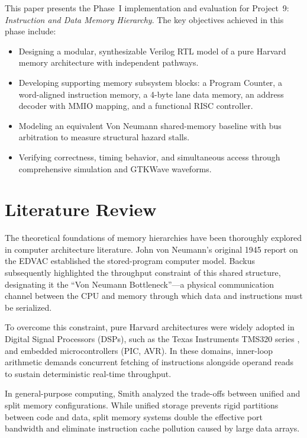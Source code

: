 \documentclass[conference]{IEEEtran}
\begin{document}
This paper presents the Phase~I implementation and evaluation for Project~9: \textit{Instruction and Data Memory Hierarchy}. The key objectives achieved in this phase include:
\begin{itemize}
    \item Designing a modular, synthesizable Verilog RTL model of a pure Harvard memory architecture with independent pathways.
    \item Developing supporting memory subsystem blocks: a Program Counter, a word-aligned instruction memory, a 4-byte lane data memory, an address decoder with MMIO mapping, and a functional RISC controller.
    \item Modeling an equivalent Von Neumann shared-memory baseline with bus arbitration to measure structural hazard stalls.
    \item Verifying correctness, timing behavior, and simultaneous access through comprehensive simulation and GTKWave waveforms.
\end{itemize}

\section{Literature Review}
The theoretical foundations of memory hierarchies have been thoroughly explored in computer architecture literature. John von Neumann's original 1945 report on the EDVAC \cite{vonneumann1945} established the stored-program computer model. Backus \cite{backus1978can} subsequently highlighted the throughput constraint of this shared structure, designating it the ``Von Neumann Bottleneck''---a physical communication channel between the CPU and memory through which data and instructions must be serialized.

To overcome this constraint, pure Harvard architectures were widely adopted in Digital Signal Processors (DSPs), such as the Texas Instruments TMS320 series \cite{smith1997scientist}, and embedded microcontrollers (PIC, AVR). In these domains, inner-loop arithmetic demands concurrent fetching of instructions alongside operand reads to sustain deterministic real-time throughput.

In general-purpose computing, Smith \cite{smith1982cache} analyzed the trade-offs between unified and split memory configurations. While unified storage prevents rigid partitions between code and data, split memory systems double the effective port bandwidth and eliminate instruction cache pollution caused by large data arrays.
\end{document}
